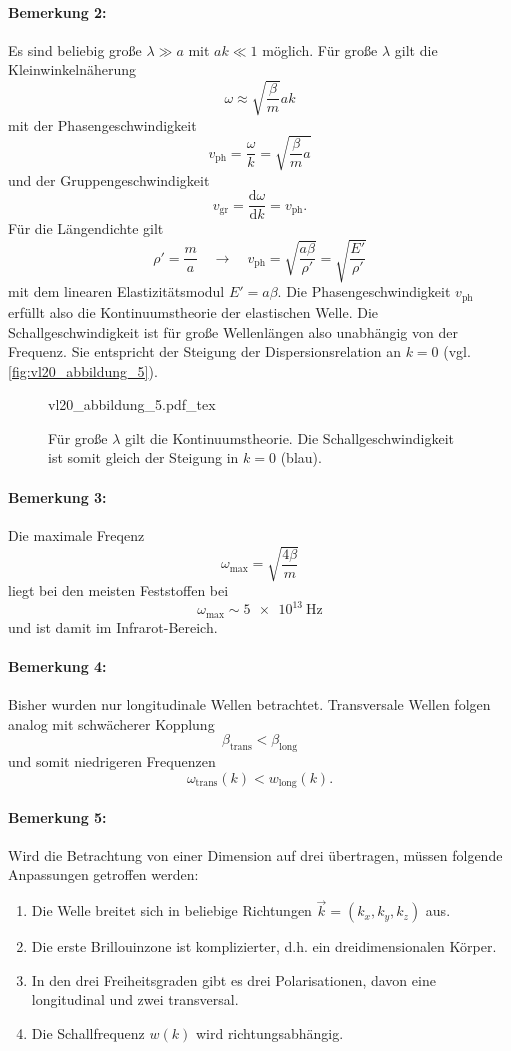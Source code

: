 \paragraph{Bemerkung 2:}
	Es sind beliebig große $\lambda \gg a$ mit $ak \ll 1$ möglich. Für große $\lambda$ gilt die Kleinwinkelnäherung
	$$
	\omega \approx \sqrt{\frac{\beta}{m}} ak
	$$ 
	mit der Phasengeschwindigkeit 
	$$
	v_{\text{ph}} = \frac{\omega}{k} = \sqrt{\frac{\beta}{m} a} 
	$$ 
	und der Gruppengeschwindigkeit
	$$
	v_{\text{gr}} = \frac{\text{d} \omega}{\text{d}k} = v_{\text{ph}}.
	$$ 
	Für die Längendichte gilt
	$$
	\rho' = \frac{m}{a} \quad \to \quad v_{\text{ph}} = \sqrt{ \frac{a \beta}{\rho'}} = \sqrt{ \frac{E'}{\rho'}} 
	$$ 
	mit dem linearen Elastizitätsmodul $E'=a \beta$. 
	Die Phasengeschwindigkeit $v_\mathrm{ph}$ erfüllt also die Kontinuumstheorie der elastischen Welle.
	Die Schallgeschwindigkeit ist für große Wellenlängen also unabhängig von der Frequenz.
	Sie entspricht der Steigung der Dispersionsrelation an $k=0$ (vgl. \autoref{fig:vl20_abbildung_5}).
	\begin{figure}[H]
		\centering
		\def\svgwidth{0.464\columnwidth}
		{vl20_abbildung_5.pdf_tex}
		\caption{Für große $\lambda$ gilt die Kontinuumstheorie. Die Schallgeschwindigkeit ist somit gleich der Steigung in $k=0$ (blau).}
		\label{fig:vl20_abbildung_5}
	\end{figure}

\paragraph{Bemerkung 3:}
	Die maximale Freqenz
	$$
	\omega_{\text{max}} = \sqrt{ \frac{4 \beta}{m}}
	$$
	liegt bei den meisten Feststoffen bei
	$$
	\omega_{\text{max}} \sim  \SI{5e13}{\hertz}
	$$
	und ist damit im Infrarot-Bereich.

\paragraph{Bemerkung 4:}
	Bisher wurden nur longitudinale Wellen betrachtet.
	Transversale Wellen folgen analog mit schwächerer Kopplung
	$$
	\beta_{\text{trans}} < \beta_{\text{long}}
	$$
	und somit niedrigeren Frequenzen
	$$
	\omega_{\text{trans}} (k) < w_{\text{long}}(k).
	$$

\paragraph{Bemerkung 5:}
	Wird die Betrachtung von einer Dimension auf drei übertragen, müssen folgende Anpassungen getroffen werden:
	\begin{enumerate}
		\item Die Welle breitet sich in beliebige Richtungen $\Vec{k} = \left( k_{x}, k_{y}, k_{z} \right) $ aus.
		\item Die erste Brillouinzone ist komplizierter, d.h. ein dreidimensionalen Körper.
		\item In den drei Freiheitsgraden gibt es drei Polarisationen, davon eine longitudinal und zwei transversal.
		\item Die Schallfrequenz $w(k)$ wird richtungsabhängig.
	\end{enumerate}

